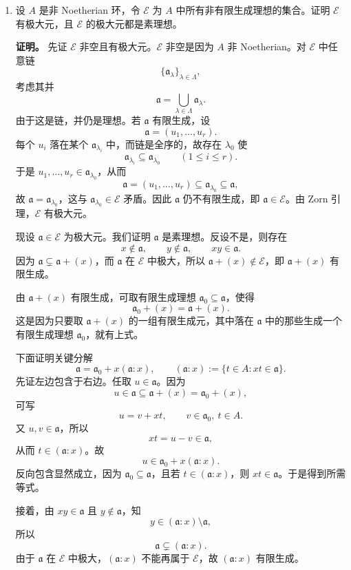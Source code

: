\documentclass[a4paper]{ctexart}
\begin{document}
\begin{enumerate}[leftmargin=*, label=\textbf{7.\arabic*.}]
\item 设 \(A\) 是非 Noetherian 环，令 \(\mathcal E\) 为 \(A\) 中所有非有限生成理想的集合。证明 \(\mathcal E\) 有极大元，且 \(\mathcal E\) 的极大元都是素理想。

\textbf{证明。}
先证 \(\mathcal E\) 非空且有极大元。\(\mathcal E\) 非空是因为 \(A\) 非 Noetherian。对 \(\mathcal E\) 中任意链
\[
\{\mathfrak a_\lambda\}_{\lambda\in\Lambda},
\]
考虑其并
\[
\mathfrak a=\bigcup_{\lambda\in\Lambda}\mathfrak a_\lambda.
\]
由于这是链，并仍是理想。若 \(\mathfrak a\) 有限生成，设
\[
\mathfrak a=(u_1,\dots,u_r).
\]
每个 \(u_i\) 落在某个 \(\mathfrak a_{\lambda_i}\) 中，而链是全序的，故存在 \(\lambda_0\) 使
\[
\mathfrak a_{\lambda_i}\subseteq \mathfrak a_{\lambda_0}\qquad (1\le i\le r).
\]
于是 \(u_1,\dots,u_r\in \mathfrak a_{\lambda_0}\)，从而
\[
\mathfrak a=(u_1,\dots,u_r)\subseteq \mathfrak a_{\lambda_0}\subseteq \mathfrak a,
\]
故 \(\mathfrak a=\mathfrak a_{\lambda_0}\)，这与 \(\mathfrak a_{\lambda_0}\in\mathcal E\) 矛盾。因此 \(\mathfrak a\) 仍不有限生成，即 \(\mathfrak a\in\mathcal E\)。由 Zorn 引理，\(\mathcal E\) 有极大元。

现设 \(\mathfrak a\in \mathcal E\) 为极大元。我们证明 \(\mathfrak a\) 是素理想。反设不是，则存在
\[
x\notin \mathfrak a,\qquad y\notin \mathfrak a,\qquad xy\in \mathfrak a.
\]
因为 \(\mathfrak a\subsetneq \mathfrak a+(x)\)，而 \(\mathfrak a\) 在 \(\mathcal E\) 中极大，所以 \(\mathfrak a+(x)\notin \mathcal E\)，即 \(\mathfrak a+(x)\) 有限生成。

由 \(\mathfrak a+(x)\) 有限生成，可取有限生成理想 \(\mathfrak a_0\subseteq \mathfrak a\)，使得
\[
\mathfrak a_0+(x)=\mathfrak a+(x).
\]
这是因为只要取 \(\mathfrak a+(x)\) 的一组有限生成元，其中落在 \(\mathfrak a\) 中的那些生成一个有限生成理想 \(\mathfrak a_0\)，就有上式。

下面证明关键分解
\[
\mathfrak a=\mathfrak a_0+x(\mathfrak a:x),
\qquad
(\mathfrak a:x):=\{t\in A:xt\in \mathfrak a\}.
\]
先证左边包含于右边。任取 \(u\in \mathfrak a\)。因为
\[
u\in \mathfrak a\subseteq \mathfrak a+(x)=\mathfrak a_0+(x),
\]
可写
\[
u=v+xt,\qquad v\in \mathfrak a_0,\ t\in A.
\]
又 \(u,v\in\mathfrak a\)，所以
\[
xt=u-v\in \mathfrak a,
\]
从而 \(t\in (\mathfrak a:x)\)。故
\[
u\in \mathfrak a_0+x(\mathfrak a:x).
\]
反向包含显然成立，因为 \(\mathfrak a_0\subseteq \mathfrak a\)，且若 \(t\in(\mathfrak a:x)\)，则 \(xt\in \mathfrak a\)。于是得到所需等式。

接着，由 \(xy\in \mathfrak a\) 且 \(y\notin\mathfrak a\)，知
\[
y\in (\mathfrak a:x)\setminus \mathfrak a,
\]
所以
\[
\mathfrak a\subsetneq (\mathfrak a:x).
\]
由于 \(\mathfrak a\) 在 \(\mathcal E\) 中极大，\((\mathfrak a:x)\) 不能再属于 \(\mathcal E\)，故 \((\mathfrak a:x)\) 有限生成。


\end{enumerate}
\end{document}
